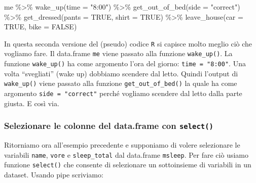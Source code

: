 \documentclass[
]{memoir}
\newenvironment{Shaded}{\begin{snugshade}}{\end{snugshade}}
\newcommand{\AttributeTok}[1]{\textcolor[rgb]{0.77,0.63,0.00}{#1}}
\newcommand{\ConstantTok}[1]{\textcolor[rgb]{0.00,0.00,0.00}{#1}}
\newcommand{\FunctionTok}[1]{\textcolor[rgb]{0.00,0.00,0.00}{#1}}
\newcommand{\NormalTok}[1]{#1}
\newcommand{\SpecialCharTok}[1]{\textcolor[rgb]{0.00,0.00,0.00}{#1}}
\newcommand{\StringTok}[1]{\textcolor[rgb]{0.31,0.60,0.02}{#1}}
\theoremstyle{definition}
\theoremstyle{definition}
\theoremstyle{definition}
\theoremstyle{definition}
\theoremstyle{remark}
\begin{document}
\begin{Shaded}
\begin{Highlighting}[]
\NormalTok{me }\SpecialCharTok{\%\textgreater{}\%}
  \FunctionTok{wake\_up}\NormalTok{(}\AttributeTok{time =} \StringTok{"8:00"}\NormalTok{) }\SpecialCharTok{\%\textgreater{}\%}
  \FunctionTok{get\_out\_of\_bed}\NormalTok{(}\AttributeTok{side =} \StringTok{"correct"}\NormalTok{) }\SpecialCharTok{\%\textgreater{}\%}
  \FunctionTok{get\_dressed}\NormalTok{(}\AttributeTok{pants =} \ConstantTok{TRUE}\NormalTok{, }\AttributeTok{shirt =} \ConstantTok{TRUE}\NormalTok{) }\SpecialCharTok{\%\textgreater{}\%}
  \FunctionTok{leave\_house}\NormalTok{(}\AttributeTok{car =} \ConstantTok{TRUE}\NormalTok{, }\AttributeTok{bike =} \ConstantTok{FALSE}\NormalTok{)}
\end{Highlighting}
\end{Shaded}

In questa seconda versione del (pseudo) codice \texttt{R} si capisce molto meglio ciò che vogliamo fare. Il data.frame \texttt{me} viene passato alla funzione \texttt{wake\_up()}. La funzione \texttt{wake\_up()} ha come argomento l'ora del giorno: \texttt{time\ =\ "8:00"}. Una volta ``svegliati'' (wake up) dobbiamo scendere dal letto. Quindi l'output di \texttt{wake\_up()} viene passato alla funzione \texttt{get\_out\_of\_bed()} la quale ha come argomento \texttt{side\ =\ "correct"} perché vogliamo scendere dal letto dalla parte giusta. E così via.

\hypertarget{selezionare-le-colonne-del-data.frame-con-select}{%
\subsubsection{\texorpdfstring{Selezionare le colonne del data.frame con \texttt{select()}}{Selezionare le colonne del data.frame con select()}}\label{selezionare-le-colonne-del-data.frame-con-select}}

Ritorniamo ora all'esempio precedente e supponiamo di volere selezionare le variabili \texttt{name}, \texttt{vore} e \texttt{sleep\_total} dal data.frame \texttt{msleep}. Per fare ciò usiamo funzione \texttt{select()} che consente di selezionare un sottoinsieme di variabili in un dataset. Usando pipe scriviamo:
\end{document}
